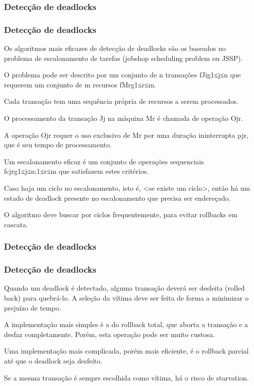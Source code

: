 \documentclass{beamer}
\begin{document}
\subsubsection{Detecção de deadlocks}
\begin{frame}
\frametitle{Detecção de deadlocks}

Os algoritmos mais eficazes de detecção de deadlocks são os baseados no problema de escalonamento de tarefas (jobshop scheduling problem ou JSSP).

O problema pode ser descrito por um conjunto de n transações fJig1≤j≤n que requerem um conjunto de m recursos fMrg1≤r≤m.

Cada transação tem uma sequência própria de recursos a serem processados.

O processamento da transação Jj na máquina Mr é chamada de operação Ojr.

A operação Ojr requer o uso exclusivo de Mr por uma duração ininterrupta pjr, que é seu tempo de processamento.

Um escalonamento eficaz é um conjunto de operações sequenciais fcjrg1≤j≤n;1≤r≤m que satisfazem estes critérios.

Caso haja um ciclo no escalonamento, isto é, <se existe um ciclo>, então há um estado de deadlock presente no escalonamento que precisa ser endereçado.

O algoritmo deve buscar por ciclos frequentemente, para evitar rollbacks em cascata.

\end{frame}

\subsubsection{Detecção de deadlocks}
\begin{frame}
\frametitle{Detecção de deadlocks}

Quando um deadlock é detectado, alguma transação deverá ser desfeita (rolled back) para quebrá-lo. A seleção da vítima deve ser feita de forma a minimizar o prejuízo de tempo.

A implementação mais simples é a do rollback total, que aborta a transação e a desfaz completamente. Porém, esta operação pode ser muito custosa.

Uma implementação mais complicada, porém mais eficiente, é o rollback parcial até que o deadlock seja desfeito.

Se a mesma transação é sempre escolhida como vítima, há o risco de starvation.

\end{frame}
\end{document}
